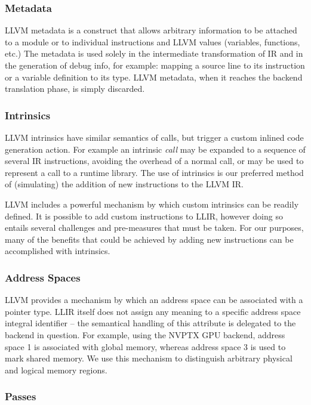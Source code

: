 \documentclass[12pt]{article}
\begin{document}
\subsubsection{Metadata}

LLVM metadata is a construct that allows arbitrary information to be attached to a module or to individual instructions and LLVM values (variables, functions, etc.) The metadata is used solely in the intermediate transformation of IR and in the generation of debug info, for example: mapping a source line to its instruction or a variable definition to its type. LLVM metadata, when it reaches the backend translation phase, is simply discarded.

\subsubsection{Intrinsics}

LLVM intrinsics have similar semantics of calls, but trigger a custom inlined code generation action. For example an intrinsic {\it call} may be expanded to a sequence of several IR instructions, avoiding the overhead of a normal call, or may be used to represent a call to a runtime library. The use of intrinsics is our preferred method of (simulating) the addition of new instructions to the LLVM IR.

LLVM includes a powerful mechanism by which custom intrinsics can be readily defined. It is possible to add custom instructions to LLIR, however doing so entails several challenges and pre-measures that must be taken. For our purposes, many of the benefits that could be achieved by adding new instructions can be accomplished with intrinsics.

\subsubsection{Address Spaces}

LLVM provides a mechanism by which an address space can be associated with a pointer type. LLIR itself does not assign any meaning to a specific address space integral identifier -- the semantical handling of this attribute is delegated to the backend in question. For example, using the NVPTX GPU backend, address space 1 is associated with global memory, whereas address space 3 is used to mark shared memory. We use this mechanism to distinguish arbitrary physical and logical memory regions.

\subsubsection{Passes}
\end{document}
